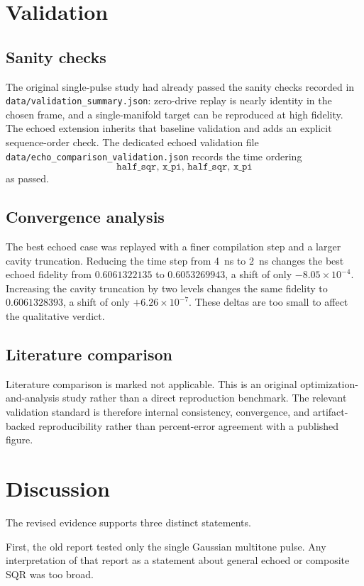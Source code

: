 \documentclass[aps,pra,twocolumn,reprint,floatfix,amsmath,amssymb]{revtex4-2}
\begin{document}
\section{Validation}

\subsection{Sanity checks}
The original single-pulse study had already passed the sanity checks recorded in \texttt{data/validation\_summary.json}: zero-drive replay is nearly identity in the chosen frame, and a single-manifold target can be reproduced at high fidelity. The echoed extension inherits that baseline validation and adds an explicit sequence-order check. The dedicated echoed validation file \texttt{data/echo\_comparison\_validation.json} records the time ordering
\[
\texttt{half\_sqr, x\_pi, half\_sqr, x\_pi}
\]
as passed.

\subsection{Convergence analysis}
The best echoed case was replayed with a finer compilation step and a larger cavity truncation. Reducing the time step from \SI{4}{ns} to \SI{2}{ns} changes the best echoed fidelity from \(0.6061322135\) to \(0.6053269943\), a shift of only \(-8.05\times10^{-4}\). Increasing the cavity truncation by two levels changes the same fidelity to \(0.6061328393\), a shift of only \(+6.26\times10^{-7}\). These deltas are too small to affect the qualitative verdict.

\subsection{Literature comparison}
Literature comparison is marked not applicable. This is an original optimization-and-analysis study rather than a direct reproduction benchmark. The relevant validation standard is therefore internal consistency, convergence, and artifact-backed reproducibility rather than percent-error agreement with a published figure.

\section{Discussion}
The revised evidence supports three distinct statements.

First, the old report tested only the single Gaussian multitone pulse. Any interpretation of that report as a statement about general echoed or composite SQR was too broad.
\end{document}
